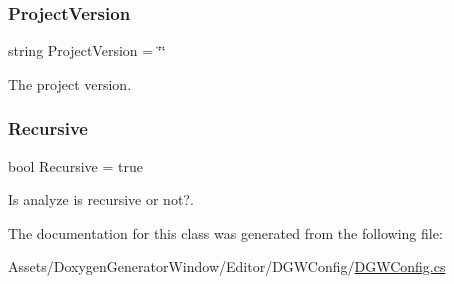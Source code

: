 \subsubsection{\texorpdfstring{Project\+Version}{ProjectVersion}}
{\footnotesize\ttfamily string Project\+Version = \char`\"{}\char`\"{}}



The project version. 

\mbox{\label{classDoxygenGeneratorWindow_1_1DGWConfig_a087d066fb97182b1ec164e5103493c9b}} 
\subsubsection{\texorpdfstring{Recursive}{Recursive}}
{\footnotesize\ttfamily bool Recursive = true}



Is analyze is recursive or not?. 



The documentation for this class was generated from the following file\+:\begin{DoxyCompactItemize}
\item 
Assets/\+Doxygen\+Generator\+Window/\+Editor/\+D\+G\+W\+Config/\hyperlink{DGWConfig_8cs}{D\+G\+W\+Config.\+cs}\end{DoxyCompactItemize}
